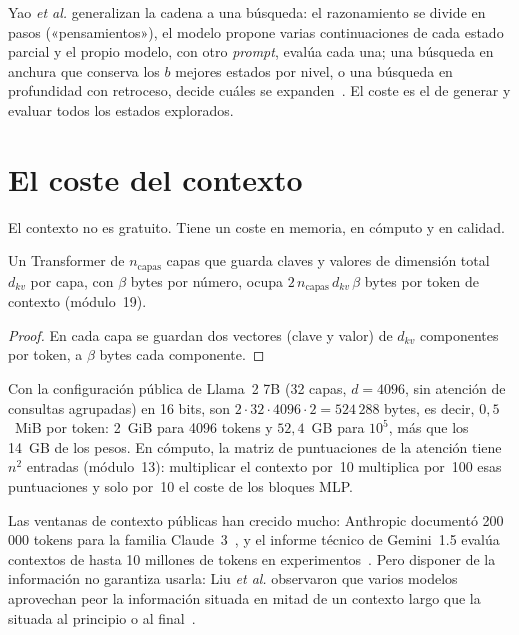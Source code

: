 \begin{observacion}
Yao \emph{et al.} generalizan la cadena a una búsqueda: el razonamiento se divide en pasos («pensamientos»), el modelo propone varias continuaciones de cada estado parcial y el propio modelo, con otro \emph{prompt}, evalúa cada una; una búsqueda en anchura que conserva los $b$ mejores estados por nivel, o una búsqueda en profundidad con retroceso, decide cuáles se expanden~\cite{yao-tot}. El coste es el de generar y evaluar todos los estados explorados.
\end{observacion}

\section{El coste del contexto}

El contexto no es gratuito. Tiene un coste en memoria, en cómputo y en calidad.

\begin{proposicion}\label{prop:kv}
Un Transformer de $n_{\mathrm{capas}}$ capas que guarda claves y valores de dimensión total $d_{kv}$ por capa, con $\beta$ bytes por número, ocupa $2\,n_{\mathrm{capas}}\,d_{kv}\,\beta$ bytes por token de contexto (módulo~19).
\end{proposicion}

\begin{proof}
En cada capa se guardan dos vectores (clave y valor) de $d_{kv}$ componentes por token, a $\beta$ bytes cada componente.
\end{proof}

Con la configuración pública de Llama~2 7B (32 capas, $d=4096$, sin atención de consultas agrupadas) en 16 bits, son $2\cdot 32\cdot 4096\cdot 2=524\,288$ bytes, es decir, $0{,}5$~MiB por token: 2~GiB para 4096 tokens y $52{,}4$~GB para $10^{5}$, más que los 14~GB de los pesos. En cómputo, la matriz de puntuaciones de la atención tiene $n^{2}$ entradas (módulo~13): multiplicar el contexto por~10 multiplica por~100 esas puntuaciones y solo por~10 el coste de los bloques MLP.

\begin{observacion}\label{obs:lost}
Las ventanas de contexto públicas han crecido mucho: Anthropic documentó 200\,000 tokens para la familia Claude~3~\cite{claude3}, y el informe técnico de Gemini~1.5 evalúa contextos de hasta 10 millones de tokens en experimentos~\cite{gemini15}. Pero disponer de la información no garantiza usarla: Liu \emph{et al.} observaron que varios modelos aprovechan peor la información situada en mitad de un contexto largo que la situada al principio o al final~\cite{liu-lost}.
\end{observacion}

